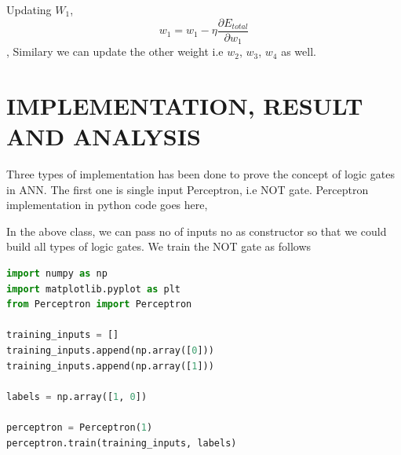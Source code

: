 \documentclass[a4paper,12pt]{report}
\begin{document}
Updating $W_1$,
\begin{equation}
w_1 = w_1 -  \eta \frac{\partial E_{total}}{\partial w_1}
\end{equation},
Similary we can update the other weight i.e $w_2$, $w_3$, $w_4$ as well.



\chapter{IMPLEMENTATION, RESULT AND ANALYSIS}
Three types of implementation has been done to prove the concept of logic gates in ANN. The first one is single input Perceptron, i.e NOT gate. Perceptron implementation in python code goes here,


In the above class, we can pass no of inputs no as constructor so that we could build all types of logic gates. We train the NOT gate as follows

\begin{lstlisting}[language=Python]
import numpy as np
import matplotlib.pyplot as plt
from Perceptron import Perceptron

training_inputs = []
training_inputs.append(np.array([0]))
training_inputs.append(np.array([1]))

labels = np.array([1, 0])

perceptron = Perceptron(1)
perceptron.train(training_inputs, labels)
\end{lstlisting}
\end{document}
